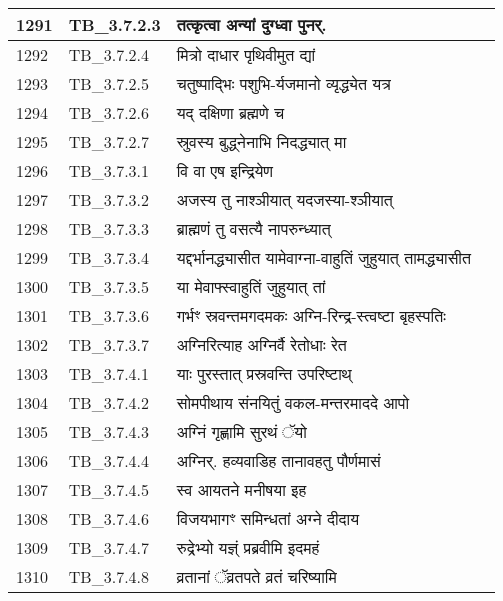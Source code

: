 \documentclass[17pt]{extarticle}
\begin{document}
\begin{longtable}{||p{0.4in}||p{0.9in}||p{4.0in}||p{0.9in}||}
        \hline
            1291 & TB\_3.7.2.3 & तत्कृत्वा अन्यां दुग्ध्वा पुनर्. &      \\
        \hline
            1292 & TB\_3.7.2.4 & मित्रो दाधार पृथिवीमुत द्यां &      \\
        \hline
            1293 & TB\_3.7.2.5 & चतुष्पाद्भिः पशुभि{-}र्यजमानो व्यृद्ध्येत यत्र &      \\
        \hline
            1294 & TB\_3.7.2.6 & यद् दक्षिणा ब्रह्मणे च &      \\
        \hline
            1295 & TB\_3.7.2.7 & स्रुवस्य बुद्ध्नेनाभि निदद्ध्यात् मा &      \\
        \hline
            1296 & TB\_3.7.3.1 & वि वा एष इन्द्रियेण &      \\
        \hline
            1297 & TB\_3.7.3.2 & अजस्य तु नाश्ञीयात् यदजस्या{-}श्ञीयात् &      \\
        \hline
            1298 & TB\_3.7.3.3 & ब्राह्मणं तु वसत्यै नापरुन्ध्यात् &      \\
        \hline
            1299 & TB\_3.7.3.4 & यद्दर्भानद्ध्यासीत यामेवाग्ना{-}वाहुतिं जुहुयात् तामद्ध्यासीत &      \\
        \hline
            1300 & TB\_3.7.3.5 & या मेवाफ्स्वाहुतिं जुहुयात् तां &      \\
        \hline
            1301 & TB\_3.7.3.6 & गर्भꣳ स्रवन्तमगदमकः अग्नि{-}रिन्द्र{-}स्त्वष्टा बृहस्पतिः &      \\
        \hline
            1302 & TB\_3.7.3.7 & अग्निरित्याह अग्निर्वै रेतोधाः रेत &      \\
        \hline
            1303 & TB\_3.7.4.1 & याः पुरस्तात् प्रस्रवन्ति उपरिष्टाथ् &      \\
        \hline
            1304 & TB\_3.7.4.2 & सोमपीथाय संनयितुं वकल{-}मन्तरमाददे आपो &      \\
        \hline
            1305 & TB\_3.7.4.3 & अग्निं गृह्णामि सुरथं ॅयो &      \\
        \hline
            1306 & TB\_3.7.4.4 & अग्निर्. हव्यवाडिह तानावहतु पौर्णमासं &      \\
        \hline
            1307 & TB\_3.7.4.5 & स्व आयतने मनीषया इह &      \\
        \hline
            1308 & TB\_3.7.4.6 & विजयभागꣳ समिन्धतां अग्ने दीदाय &      \\
        \hline
            1309 & TB\_3.7.4.7 & रुद्रेभ्यो यज्ञ्ं प्रब्रवीमि इदमहं &      \\
        \hline
            1310 & TB\_3.7.4.8 & व्रतानां ॅव्रतपते व्रतं चरिष्यामि &      \\

\end{longtable}
\end{document}
